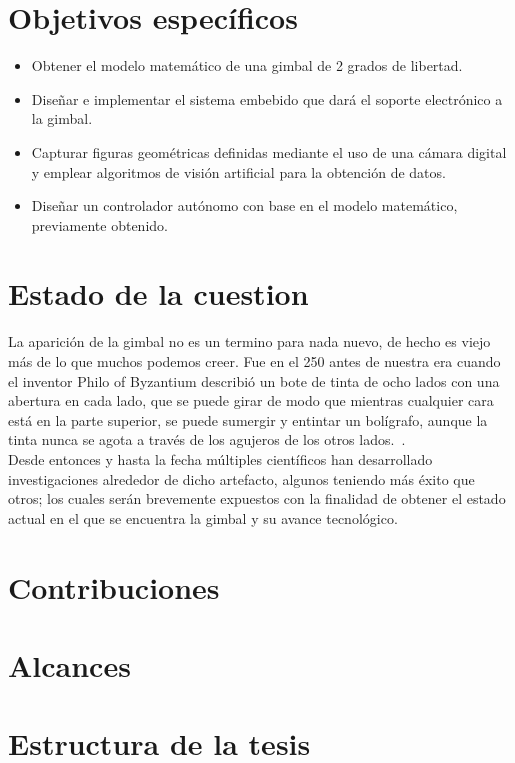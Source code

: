 \section{Objetivos específicos}
\begin{itemize}
    \item Obtener el modelo matemático de una gimbal de 2 grados de libertad.
    \item Diseñar e implementar el sistema embebido que dará el soporte electrónico a la gimbal.
    \item Capturar figuras geométricas definidas  mediante el uso de una cámara digital y emplear algoritmos de visión artificial para la obtención de datos. 
    \item Diseñar un controlador autónomo con base en el modelo matemático, previamente obtenido.
    \end{itemize}

\section{Estado de la cuestion}
La aparición de la gimbal no es un termino para nada nuevo, de hecho es viejo más de lo que
muchos podemos creer. Fue en el 250 antes de nuestra era cuando el inventor Philo of Byzantium
describió un bote de tinta de ocho lados con una abertura en cada lado, que se puede
girar de modo que mientras cualquier cara está en la parte superior, se puede sumergir y
entintar un bolígrafo, aunque la tinta nunca se agota a través de los agujeros de los otros
lados.~\cite{Gimbal}.\\
Desde entonces y hasta la fecha múltiples científicos han desarrollado investigaciones alrededor
de dicho artefacto, algunos teniendo más éxito que otros; los cuales serán brevemente expuestos
con la finalidad de obtener el estado actual en el que se encuentra la gimbal y su avance
tecnológico.

\section{Contribuciones}

\section{Alcances}


\section{Estructura de la tesis}
